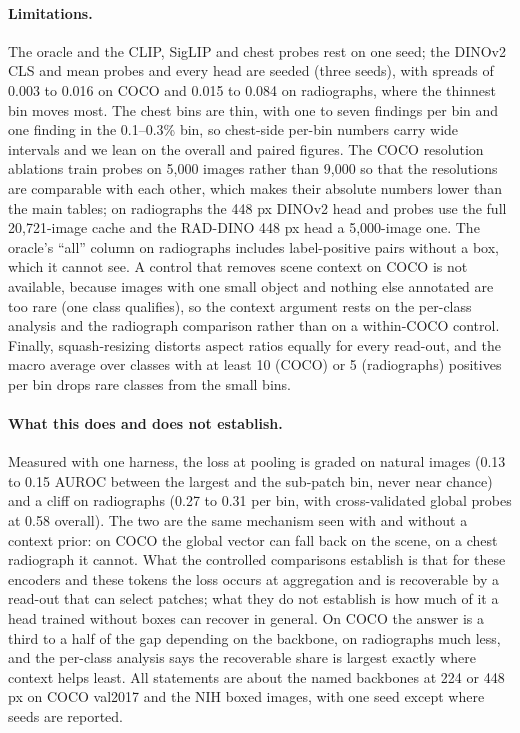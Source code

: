 \documentclass[10pt,letterpaper,twocolumn]{article}
\begin{document}
\paragraph{Limitations.}
The oracle and the CLIP, SigLIP and chest probes rest on one seed; the DINOv2 CLS and mean probes and every head are seeded (three seeds), with spreads of 0.003 to 0.016 on COCO and 0.015 to 0.084 on radiographs, where the thinnest bin moves most. The
chest bins are thin, with one to seven findings per bin and one finding in the 0.1--0.3\% bin,
so chest-side per-bin numbers carry wide intervals and we lean on the overall and paired
figures. The COCO resolution ablations train probes on 5,000 images rather than 9,000 so that the
resolutions are comparable with each other, which makes their absolute numbers lower than the
main tables; on radiographs the 448 px DINOv2 head and probes use the full 20,721-image cache and
the RAD-DINO 448 px head a 5,000-image one. The oracle's ``all'' column on radiographs
includes label-positive pairs without a box, which it cannot see. A control that removes
scene context on COCO is not available, because images with one small object and nothing
else annotated are too rare (one class qualifies), so the context argument rests on the
per-class analysis and the radiograph comparison rather than on a within-COCO control.
Finally, squash-resizing distorts aspect ratios equally for every read-out, and the macro
average over classes with at least 10 (COCO) or 5 (radiographs) positives per bin drops rare
classes from the small bins.

\paragraph{What this does and does not establish.}
Measured with one harness, the loss at pooling is graded on natural images (0.13 to 0.15 AUROC
between the largest and the sub-patch bin, never near chance) and a cliff on radiographs
(0.27 to 0.31 per bin, with cross-validated global probes at 0.58 overall). The two are the
same mechanism seen with and without a context prior: on COCO the global vector can fall back
on the scene, on a chest radiograph it cannot. What the controlled comparisons establish is
that for these encoders and these tokens the loss occurs at aggregation and is recoverable
by a read-out that can select patches; what they do not establish is how much of it a head
trained without boxes can recover in general. On COCO the answer is a third to a half
of the gap depending on the backbone, on radiographs much less, and the per-class
analysis says the recoverable share is largest exactly where context helps least. All
statements are about the named backbones at 224 or 448 px on COCO val2017 and the NIH boxed
images, with one seed except where seeds are reported.
\end{document}
